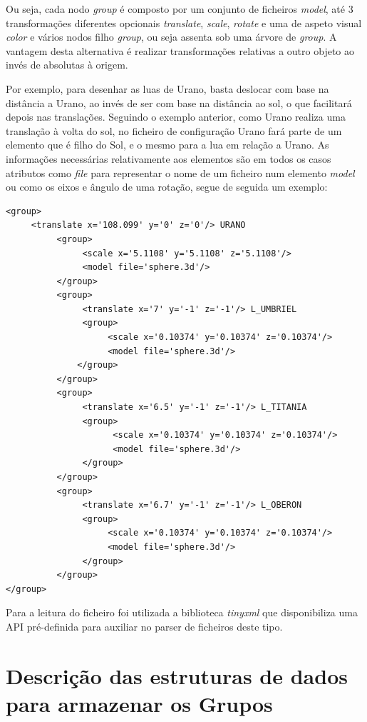 Ou seja, cada nodo \textit{group} é composto por um conjunto de ficheiros \textit{model}, até 3 transformações diferentes opcionais \textit{translate}, \textit{scale}, \textit{rotate} e uma de aspeto visual \textit{color} e vários nodos filho \textit{group}, ou seja assenta sob uma árvore de \textit{group}.  A vantagem desta alternativa é realizar transformações relativas a outro objeto ao invés de absolutas à origem. 

Por exemplo, para desenhar as luas de Urano, basta deslocar com base na distância a Urano, ao invés de ser com base na distância ao sol, o que facilitará depois nas translações. Seguindo o exemplo anterior, como Urano realiza uma translação à volta do sol, no ficheiro de configuração Urano fará parte de um elemento que é filho do Sol, e o mesmo para a lua em relação a Urano. As informações necessárias relativamente aos elementos são em todos os casos atributos como \textit{file} para representar o nome de um ficheiro num elemento \textit{model} ou como os eixos e ângulo de uma rotação, segue de seguida um exemplo: 

\begin{Verbatim}
<group>
     <translate x='108.099' y='0' z='0'/> URANO
          <group>
               <scale x='5.1108' y='5.1108' z='5.1108'/>
               <model file='sphere.3d'/>
          </group>
          <group>
               <translate x='7' y='-1' z='-1'/> L_UMBRIEL
               <group>
                    <scale x='0.10374' y='0.10374' z='0.10374'/>
                    <model file='sphere.3d'/>
              </group>
          </group>
          <group>
               <translate x='6.5' y='-1' z='-1'/> L_TITANIA
               <group>
                     <scale x='0.10374' y='0.10374' z='0.10374'/>
                     <model file='sphere.3d'/>
               </group>
          </group>
          <group>
               <translate x='6.7' y='-1' z='-1'/> L_OBERON
               <group>
                    <scale x='0.10374' y='0.10374' z='0.10374'/>
                    <model file='sphere.3d'/>
               </group>
          </group>
</group>
\end{Verbatim}

Para a leitura do ficheiro foi utilizada a biblioteca \textit{tinyxml} que disponibiliza uma API pré-definida para auxiliar no parser de ficheiros deste tipo.  


\section{ Descrição das estruturas de dados para armazenar os Grupos}

